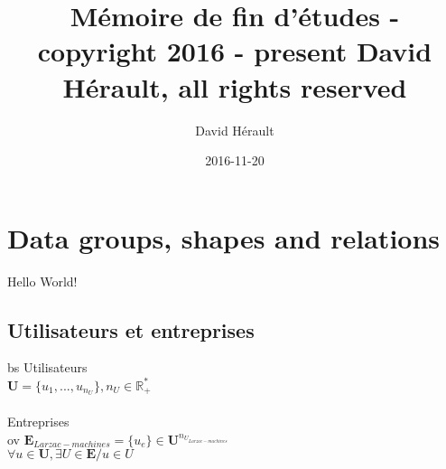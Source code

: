 \documentclass[a4paper,12pt]{article}
\title{M\'{e}moire de fin d'études - copyright 2016 - present David H\'{e}rault, all rights reserved}
\date{2016-11-20}
\author{David H\'{e}rault}
\newcommand\mbold[1]{\mathbf{#1}}
\newcommand\mshal[1]{\mathbb{#1}} %
\begin{document}
\maketitle
\newpage
{}

\tableofcontents
\newpage

\section{Data groups, shapes and relations}

  Hello World!

\subsection{Utilisateurs et entreprises}
bs
Utilisateurs\\
$\mbold{U} = \{ u_1, ..., u_{n_U} \}, n_U \in \mshal{R}_{+}^{*}$\\
\\
Entreprises\\ov
$\mbold{E}_{Larzac-machines} = \{ u_e\} \in \mbold{U}^{n_{U_{Larzac-machines}}}$\\
$\forall u \in \mbold{U}, \exists U \in \mbold{E} / u \in U$
\end{document}
